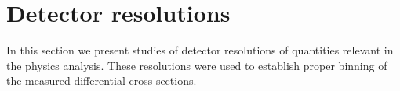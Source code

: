
\section{Detector resolutions}\label{sec:resolutions}

In this section we present studies of detector resolutions of quantities relevant in the physics analysis. These resolutions were used to establish proper binning of the measured differential cross sections.

